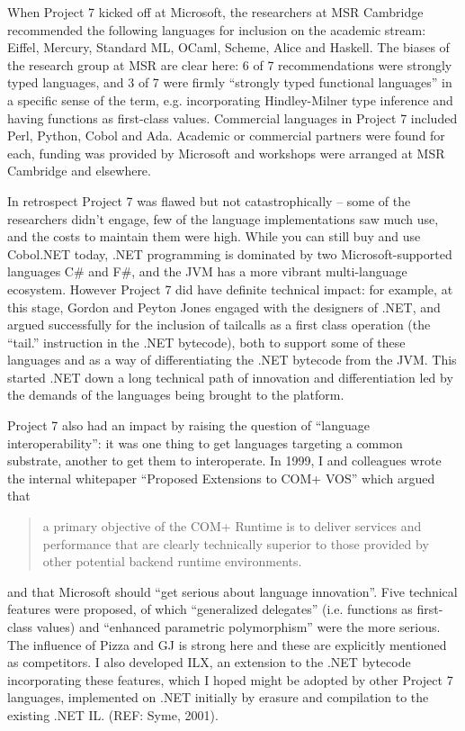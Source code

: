 \documentclass[acmsmall,review]{acmart}\settopmatter{printfolios=true,printccs=false,printacmref=false}
\begin{document}
When Project 7 kicked off at Microsoft, the researchers at MSR Cambridge recommended the following languages for inclusion on the academic stream: Eiffel, Mercury, Standard ML, OCaml, Scheme, Alice and Haskell.  The biases of the research group at MSR are clear here: 6 of 7 recommendations were strongly typed languages, and 3 of 7 were firmly “strongly typed functional languages” in a specific sense of the term, e.g. incorporating Hindley-Milner type inference and having functions as first-class values. Commercial languages in Project 7 included Perl, Python, Cobol and Ada. Academic or commercial partners were found for each, funding was provided by Microsoft and workshops were arranged at MSR Cambridge and elsewhere.

In retrospect Project 7 was flawed but not catastrophically – some of the researchers didn’t engage, few of the language implementations saw much use, and the costs to maintain them were high. While you can still buy and use Cobol.NET today, .NET programming is dominated by two Microsoft-supported languages C\# and F\#, and the JVM has a more vibrant multi-language ecosystem. However Project 7 did have definite technical impact: for example, at this stage, Gordon and Peyton Jones engaged with the designers of .NET, and argued successfully for the inclusion of tailcalls as a first class operation (the “tail.” instruction in the .NET bytecode), both to support some of these languages and as a way of differentiating the .NET bytecode from the JVM.  This started .NET down a long technical path of innovation and differentiation led by the demands of the languages being brought to the platform.   

Project 7 also had an impact by raising the question of “language interoperability”: it was one thing to get languages targeting a common substrate, another to get them to interoperate.  In 1999, I and colleagues wrote the internal whitepaper “Proposed Extensions to COM+ VOS”  which argued that 

\begin{quote}
a primary objective of the COM+ Runtime is to deliver services and performance that are clearly technically superior to those provided by other potential backend runtime environments. 
\end{quote}
and that Microsoft should “get serious about language innovation”.  Five technical features were proposed, of which “generalized delegates” (i.e. functions as first-class values) and “enhanced parametric polymorphism” were the more serious.  The influence of Pizza and GJ is strong here and these are explicitly mentioned as competitors. I also developed ILX, an extension to the .NET bytecode incorporating these features, which I hoped might be adopted by other Project 7 languages, implemented on .NET initially by erasure and compilation to the existing .NET IL. (REF: Syme, 2001).
\end{document}
